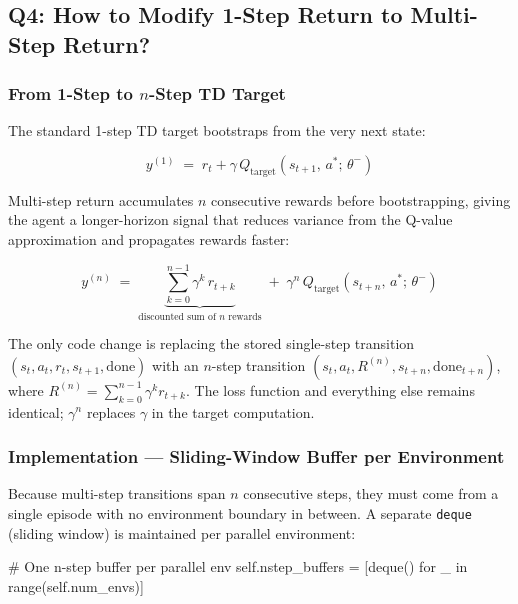 \documentclass[12pt,a4paper]{report}
\begin{document}
\subsection*{Q4: How to Modify 1-Step Return to Multi-Step Return?}

\subsubsection*{From 1-Step to $n$-Step TD Target}

The standard 1-step TD target bootstraps from the very next state:

\begin{equation}
  y^{(1)} \;=\; r_t + \gamma\, Q_{\text{target}}(s_{t+1},\, a^*;\,\theta^-)
\end{equation}

Multi-step return accumulates $n$ consecutive rewards before bootstrapping,
giving the agent a longer-horizon signal that reduces variance from
the Q-value approximation and propagates rewards faster:

\begin{equation}
  y^{(n)} \;=\;
  \underbrace{\sum_{k=0}^{n-1} \gamma^k\, r_{t+k}}_{\text{discounted sum of }n\text{ rewards}}
  \;+\;
  \gamma^n\, Q_{\text{target}}(s_{t+n},\, a^*;\,\theta^-)
\end{equation}

The only code change is replacing the stored single-step transition
$(s_t, a_t, r_t, s_{t+1}, \text{done})$
with an $n$-step transition
$(s_t, a_t, R^{(n)}, s_{t+n}, \text{done}_{t+n})$,
where $R^{(n)} = \sum_{k=0}^{n-1} \gamma^k r_{t+k}$.
The loss function and everything else remains identical;
$\gamma^n$ replaces $\gamma$ in the target computation.

\subsubsection*{Implementation — Sliding-Window Buffer per Environment}

Because multi-step transitions span $n$ consecutive steps,
they must come from a single episode with no environment boundary in between.
A separate \texttt{deque} (sliding window) is maintained per parallel environment:

\begin{pycode}
# One n-step buffer per parallel env
self.nstep_buffers = [deque() for _ in range(self.num_envs)]
\end{pycode}
\end{document}
